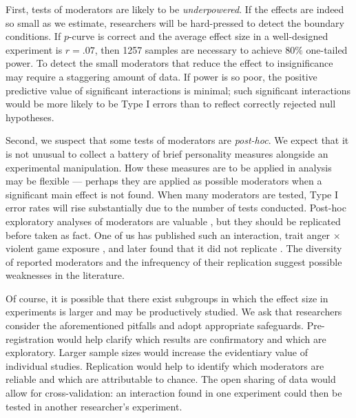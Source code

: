 \documentclass[man]{apa6}
\begin{document}
First, tests of moderators are likely to be {\em underpowered}. If the effects are indeed so small as we estimate, researchers will be hard-pressed to detect the boundary conditions. If $p$-curve is correct and the average effect size in a well-designed experiment is $r = .07$, then 1257 samples are necessary to achieve $80\%$ one-tailed power. To detect the small moderators that reduce the effect to insignificance may require a staggering amount of data. If power is so poor, the positive predictive value of significant interactions is minimal; such significant interactions would be more likely to be Type I errors than to reflect correctly rejected null hypotheses. 

Second, we suspect that some tests of moderators are {\em post-hoc}. We expect that it is not unusual to collect a battery of brief personality measures alongside an experimental manipulation. How these measures are to be applied in analysis may be flexible --- perhaps they are applied as possible moderators when a significant main effect is not found. When many moderators are tested, Type I error rates will rise substantially due to the number of tests conducted. Post-hoc exploratory analyses of moderators are valuable \citep[indeed, we have presented them ourselves in the past,][]{Engelhardt:etal:2015a}, but they should be replicated before taken as fact. %
One of us has published such an interaction, trait anger $\times$ violent game exposure \citep{Engelhardt:etal:2011a}, and later found that it did not replicate \citep{Engelhardt:etal:inprep}. The diversity of reported moderators and the infrequency of their replication suggest possible weaknesses in the literature. 

Of course, it is possible that there exist subgroups in which the effect size in experiments is larger and may be productively studied. We ask that researchers consider the aforementioned pitfalls and adopt appropriate safeguards. Pre-registration would help clarify which results are confirmatory and which are exploratory. Larger sample sizes would increase the evidentiary value of individual studies. Replication would help to identify which moderators are reliable and which are attributable to chance. The open sharing of data would allow for cross-validation: an interaction found in one experiment could then be tested in another researcher's experiment.
\end{document}
